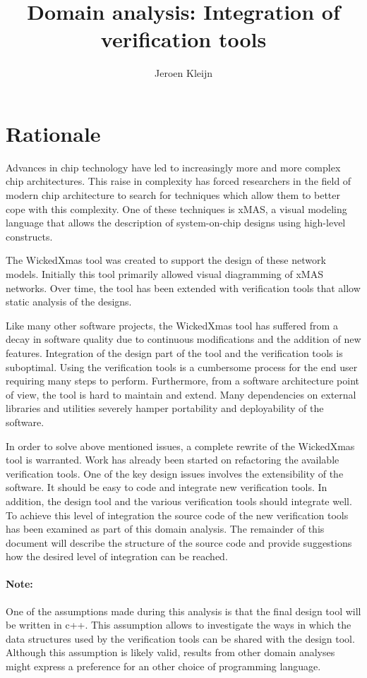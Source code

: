 \documentclass[a4paper,11pt]{article}
\title{Domain analysis: Integration of verification tools}
\author{Jeroen Kleijn}
\begin{document}
\maketitle

\section{Rationale}

Advances in chip technology have led to increasingly more and more complex chip
architectures. This raise in complexity has forced researchers in the field of
modern chip architecture to search for techniques which allow them to better cope
with this complexity. One of these techniques is xMAS\cite{chatterjee10,xmas}, a visual modeling
language that allows the description of system-on-chip designs using high-level constructs.

The WickedXmas\cite{13_toolxmas} tool was created to support the design of these network
models. Initially this tool primarily allowed visual diagramming of xMAS networks.
Over time, the tool has been extended with verification tools that allow static
analysis of the designs.

Like many other software projects, the WickedXmas tool has suffered from a decay in
software quality due to continuous modifications and the addition of new features.
Integration of the design part of the tool and the verification tools is suboptimal.
Using the verification tools is a cumbersome process for the end user requiring many
steps to perform. Furthermore, from a software architecture point of view, the tool
is hard to maintain and extend. Many dependencies on external libraries and utilities
severely hamper portability and deployability of the software.

In order to solve above mentioned issues, a complete rewrite of the WickedXmas tool is
warranted. Work has already been started on refactoring the available verification tools.
One of the key design issues involves the extensibility of the software. It should be
easy to code and integrate new verification tools. In addition, the design tool and
the various verification tools should integrate well.
To achieve this level of integration the source code of the new verification tools has
been examined as part of this domain analysis. The remainder of this document will describe
the structure of the source code and provide suggestions how the desired level of integration
can be reached.

\paragraph{Note:}
One of the assumptions made during this analysis is that the final design tool will be
written in c++. This assumption allows to investigate the ways in which the data structures
used by the verification tools can be shared with the design tool. Although this assumption
is likely valid, results from other domain analyses might express a preference for an
other choice of programming language.
\end{document}
